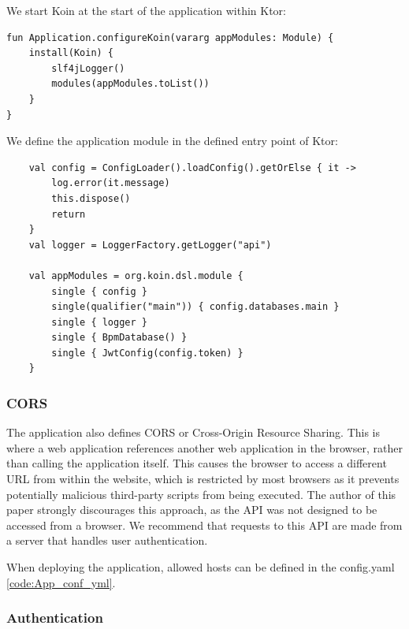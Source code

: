 We start Koin at the start of the application within Ktor:

\begin{verbatim}
fun Application.configureKoin(vararg appModules: Module) {
    install(Koin) {
        slf4jLogger()
        modules(appModules.toList())
    }
}
\end{verbatim}

We define the application module in the defined entry point of Ktor:

\newpage

\begin{verbatim}
    val config = ConfigLoader().loadConfig().getOrElse { it ->
        log.error(it.message)
        this.dispose()
        return
    }
    val logger = LoggerFactory.getLogger("api")

    val appModules = org.koin.dsl.module {
        single { config }
        single(qualifier("main")) { config.databases.main }
        single { logger }
        single { BpmDatabase() }
        single { JwtConfig(config.token) }
    }
\end{verbatim}


\subsubsection{CORS}

The application also defines CORS or Cross-Origin Resource Sharing. This is where a web application references another web application in the browser, rather than calling the application itself. This causes the browser to access a different URL from within the website, which is restricted by most browsers as it prevents potentially malicious third-party scripts from being executed. The author of this paper strongly discourages this approach, as the API was not designed to be accessed from a browser. We recommend that requests to this API are made from a server that handles user authentication.

When deploying the application, allowed hosts can be defined in the config.yaml \ref{code:App_conf_yml}.

\subsubsection{Authentication}

